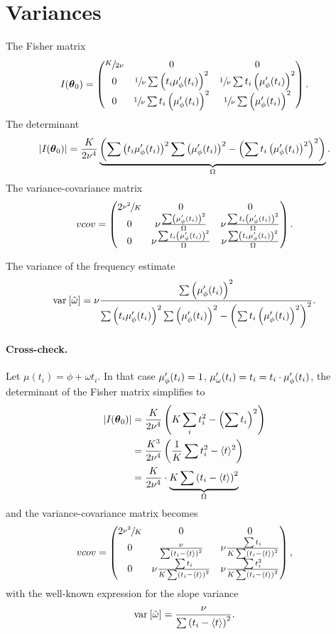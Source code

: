 \documentclass{article}
\begin{document}
\section{Variances}

The Fisher matrix
\[
	\Fisher = \begin{pmatrix}
	\sfrac{K}{2\nu} & 0 								& 0 \\
	0 				& \sfrac1\nu\sum\bkt{t_i\mupp}^2	& \sfrac1\nu\sum t_i\bkt{\mupp}^2 \\
	0				& \sfrac1\nu\sum t_i\bkt{\mupp}^2	&\sfrac1\nu\sum\bkt{\mupp}^2
	\end{pmatrix}.
\]
The determinant
\newcommand{\STM}{\Omega}
\[
	|\Fisher| = \frac{K}{2\nu^4}\underbrace{\bkt{\sum\bkt{t_i\mupp}^2\sum\bkt{\mupp}^2 - \bkt{\sum t_i\bkt{\mupp}^2}^2}}_{\STM}.
\]
The variance-covariance matrix
\[
vcov = \begin{pmatrix}
	2\sfrac{\nu^2}{K}& 0									& 0				\\
	0				&\nu\frac{\sum\bkt{\mupp}^2}{\STM}		&\nu\frac{\sum t_i\bkt{\mupp}^2}{\STM}\\
	0				&\nu\frac{\sum t_i\bkt{\mupp}^2}{\STM}	&\nu\frac{\sum\bkt{t_i\mupp}^2}{\STM}
\end{pmatrix}.
\]

The variance of the frequency estimate
\begin{equation}\label{eq:Var1}
	\var{\hat{\omega}} = \nu\frac{\sum\bkt{\mupp}^2}{\sum\bkt{t_i\mupp}^2\sum\bkt{\mupp}^2 - \bkt{\sum t_i\bkt{\mupp}^2}^2}.
\end{equation}

\newcommand{\avg}[1]{\langle #1\rangle}
\paragraph{Cross-check.} Let $\mu(t_i) = \phi + \omega t_i$. In that case $\mupp = 1$, $\mu'_\omega(t_i) = t_i = t_i\cdot\mupp$, the determinant of the Fisher matrix simplifies to 
\begin{align*}
	|\Fisher| &= \frac{K}{2\nu^4}\bkt{K\sum_i t_i^2 - \bkt{\sum t_i}^2} \\
				 &= \frac{K^3}{2\nu^4}\bkt{\frac1K\sum t_i^2 - \avg{t}^2} \\
				 &= \frac{K}{2\nu^4}\cdot\underbrace{K\sum\bkt{t_i - \avg{t}}^2}_{\STM}
\end{align*}
\newcommand{\SSX}{\sum\bkt{t_i - \avg{t}}^2}
and the variance-covariance matrix becomes
\[
vcov = \begin{pmatrix}
	2\sfrac{\nu^2}{K}& 0									& 0				\\
	0				&\frac{\nu}{\SSX}		&\nu\frac{\sum t_i}{K\SSX}\\
	0				&\nu\frac{\sum t_i}{K\SSX}	&\nu\frac{\sum t_i^2}{K\SSX}
\end{pmatrix},
\]
with the well-known expression for the slope variance
\[
	\var{\hat\omega} = \frac{\nu}{\SSX}.
\]
\end{document}
